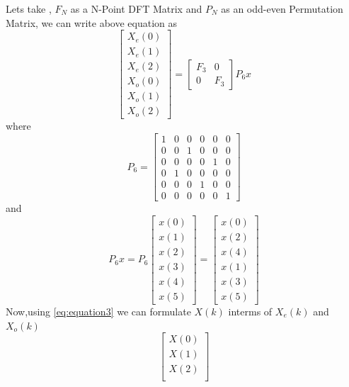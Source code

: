 \documentclass[journal,12pt,twocolumn]{IEEEtran}
\renewcommand\thesection{\arabic{section}}
\begin{document}
\begin{enumerate}[label=\thesection.\arabic*.,ref=\thesection.\theenumi]
Lets take , $F_{N}$ as a N-Point DFT Matrix and $P_{N}$ as an odd-even Permutation Matrix, we can write above equation as
\begin{equation}
\begin{bmatrix}
X_{e}(0) \\ 
X_{e}(1) \\ 
X_{e}(2) \\ 
X_{o}(0) \\ 
X_{o}(1) \\ 
X_{o}(2)
\end{bmatrix}
=
\begin{bmatrix}
F_{3} & 0 \\
0 & F_{3}
\end{bmatrix}
P_{6}
x   
\label{eq:equation6}
\end{equation}
where
\begin{equation}
P_{6} 
=
\begin{bmatrix}
1 & 0 & 0 & 0 & 0 & 0\\
0 & 0 & 1 & 0 & 0 & 0\\
0 & 0 & 0 & 0 & 1 & 0\\
0 & 1 & 0 & 0 & 0 & 0\\
0 & 0 & 0 & 1 & 0 & 0\\
0 & 0 & 0 & 0 & 0 & 1
\end{bmatrix} 
\end{equation}
and 
\begin{equation}
P_{6}x
=
P_{6}
\begin{bmatrix}
x(0) \\ 
x(1) \\ 
x(2) \\ 
x(3) \\ 
x(4) \\ 
x(5) 
\end{bmatrix}
=
\begin{bmatrix}
x(0) \\ 
x(2) \\ 
x(4) \\ 
x(1) \\ 
x(3) \\ 
x(5) 
\end{bmatrix}   
\end{equation}
Now,using \eqref{eq:equation3} we can formulate  $X(k)$ interms of $X_{e}(k)$ and $X_{o}(k)$
\begin{equation}
\begin{bmatrix}
X(0) \\ 
X(1) \\ 
X(2) \\ 

\end{bmatrix}
\end{equation}
\end{enumerate}
\end{document}
